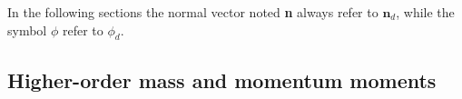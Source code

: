 
In the following sections the normal vector noted \textbf{n} always refer to $\textbf{n}_d$, while the symbol $\phi$ refer to $\phi_d$. 

\subsection{Higher-order mass and momentum moments}



